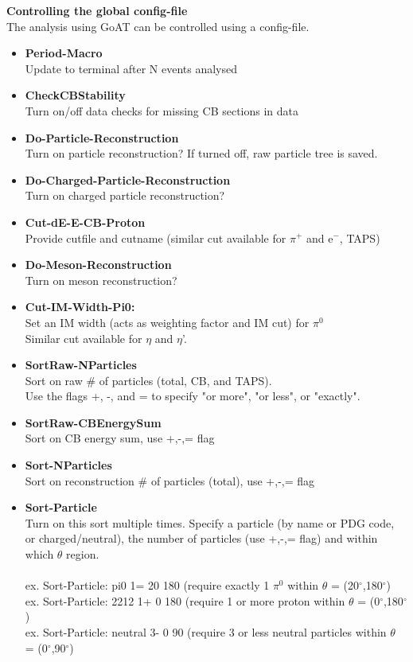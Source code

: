\documentclass[12pt]{article}
\begin{document}
\newpage
\noindent \textbf{Controlling the global config-file}\\
The analysis using GoAT can be controlled using a config-file.
\begin{itemize}
\item \textbf{Period-Macro} \\Update to terminal after N events analysed
\item \textbf{CheckCBStability} \\Turn on/off data checks for missing CB sections in data
\item \textbf{Do-Particle-Reconstruction} \\Turn on particle reconstruction? If turned off, raw particle tree is saved.
\item \textbf{Do-Charged-Particle-Reconstruction}\\Turn on charged particle reconstruction?
\item \textbf{Cut-dE-E-CB-Proton}\\Provide cutfile and cutname (similar cut available for $\pi^{+}$ and e$^{-}$, TAPS)
\item \textbf{Do-Meson-Reconstruction}\\Turn on meson reconstruction?
\item \textbf{Cut-IM-Width-Pi0:}\\ Set an IM width (acts as weighting factor and IM cut) for $\pi^{0}$ \\ Similar cut available for $\eta$ and $\eta$'.
\item \textbf{SortRaw-NParticles} \\ Sort on raw \# of particles (total, CB, and TAPS).\\Use the flags +, -, and = to specify "or more", "or less", or "exactly".
\item \textbf{SortRaw-CBEnergySum} \\ Sort on CB energy sum, use +,-,= flag
\item \textbf{Sort-NParticles} \\ Sort on reconstruction \# of particles (total), use +,-,= flag
\item \textbf{Sort-Particle} \\ Turn on this sort multiple times. Specify a particle (by name or PDG code, or charged/neutral), the number of particles (use +,-,= flag) and within which $\theta$ region.\\ \\ ex. Sort-Particle: pi0 1=	20 180 (require exactly 1 $\pi^{0}$ within $\theta$ = (20$^{\circ}$,180$^{\circ}$)
\\ ex. Sort-Particle: 2212 1+ 0 180 (require 1 or more proton within $\theta$ = (0$^{\circ}$,180$^{\circ}$)
\\ ex. Sort-Particle: neutral 3- 0 90 (require 3 or less neutral particles within $\theta$ = (0$^{\circ}$,90$^{\circ}$)
\end{itemize}
\end{document}
